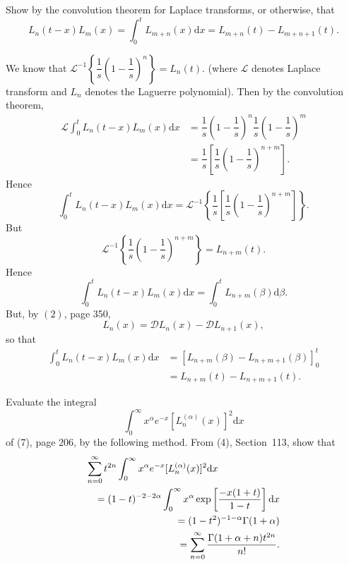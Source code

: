 \begin{problem}\label{problem11chapter12}
Show by the convolution theorem for Laplace transforms, or otherwise, that
$$L_n(t-x)L_m(x) = \displaystyle\int_0^t L_{m+n}(x) \mathrm{d}x = L_{m+n}(t) - L_{m+n+1}(t).$$
\end{problem}
\begin{solution}
We know that $\mathscr{L}^{-1} \left\{ \dfrac{1}{s} \left( 1 - \dfrac{1}{s} \right)^n \right\} = L_n(t).$ (where $\mathscr{L}$ denotes Laplace transform and $L_n$ denotes the Laguerre polynomial).
Then by the convolution theorem,
$$\begin{array}{ll}
\mathscr{L} \displaystyle\int_0^t L_n(t-x) L_m(x) \mathrm{d}x &= \dfrac{1}{s} \left( 1 - \dfrac{1}{s} \right)^n \dfrac{1}{s} \left( 1 - \dfrac{1}{s} \right)^m \\
&= \dfrac{1}{s} \left[ \dfrac{1}{s} \left( 1 - \dfrac{1}{s} \right)^{n+m} \right].
\end{array}$$
Hence
$$\displaystyle\int_0^t L_n(t-x) L_m(x) \mathrm{d}x = \mathscr{L}^{-1} \left\{ \dfrac{1}{s} \left[ \dfrac{1}{s} \left( 1 - \dfrac{1}{s} \right)^{n+m} \right] \right\}.$$
But
$$\mathscr{L}^{-1} \left\{ \dfrac{1}{s} \left( 1- \dfrac{1}{s} \right)^{n+m} \right\} = L_{n+m}(t).$$
Hence
$$\displaystyle\int_0^t L_n(t-x) L_m(x) \mathrm{d}x = \displaystyle\int_0^t L_{n+m}(\beta) \mathrm{d} \beta.$$
But, by $(2)$, page 350,
$$L_n(x) = \mathscr{D} L_n(x) - \mathscr{D} L_{n+1}(x),$$
so that
$$\begin{array}{ll}
\displaystyle\int_0^t L_n(t-x) L_m(x) \mathrm{d}x &= \left[ L_{n+m}(\beta) - L_{n+m+1}(\beta) \right]_0^t \\
&= L_{n+m}(t) - L_{n+m+1}(t).
\end{array}$$
\end{solution}
\begin{problem}\label{problem12chapter12}
Evaluate the integral
$$\displaystyle\int_0^{\infty} x^{\alpha} e^{-x} [L_n^{(\alpha)}(x)]^2 \mathrm{d}x$$
of (7), page 206, by the following method. From (4), Section~113, show that
\begin{eqnarray*}
\lefteqn{\displaystyle\sum_{n=0}^{\infty} t^{2n}\displaystyle\int_0^{\infty} x^{\alpha} e^{-x} [L_n^{(\alpha)}(x)]^2 \mathrm{d}x } \\
& &= (1-t)^{-2-2\alpha} \displaystyle\int_0^{\infty} x^{\alpha} \exp \left[ \dfrac{-x(1+t)}{1-t} \right] \mathrm{d}x \\
&&= (1-t^2)^{-1-\alpha} \Gamma(1+\alpha) \\
&&= \displaystyle\sum_{n=0}^{\infty} \dfrac{\Gamma(1+\alpha+n)t^{2n}}{n!}.
\end{eqnarray*}
\end{problem}
